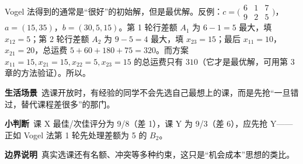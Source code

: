 \begin{warningbox}
Vogel 法得到的通常是“很好”的初始解，但是最优解。反例：$c=\bigl(\begin{smallmatrix}6&1&7\\9&2&5\end{smallmatrix}\bigr)$，$a=(15,35)$，$b=(30,5,15)$。第 1 轮行差额 $A_1$ 为 $6-1=5$ 最大，填 $x_{12}=5$；第 2 轮行差额 $A_2$ 为 $9-5=4$ 最大，填 $x_{23}=15$；最后 $x_{11}=10$，$x_{21}=20$，总运费 $5+60+180+75=320$。而方案 $x_{11}=15,x_{21}=15,x_{22}=5,x_{23}=15$ 的总运费只有 $310$（它才是最优解，可用第 3 章的方法验证）。所以。
\end{warningbox}

\begin{lifebox}
\textbf{生活场景}\ 选课开放时，有经验的同学不会先选自己最想上的课，而是先抢“一旦错过，替代课程差很多”的那门。\par
{}
\textbf{小判断}\ 课 X 最佳/次佳评分为 9/8（差 1），课 Y 为 9/3（差 6），应先抢 Y——正如 Vogel 法第 1 轮先处理差额为 5 的 $B_2$。\par
\textbf{边界说明}\ 真实选课还有名额、冲突等多种约束，这只是“机会成本”思想的类比。
\end{lifebox}


